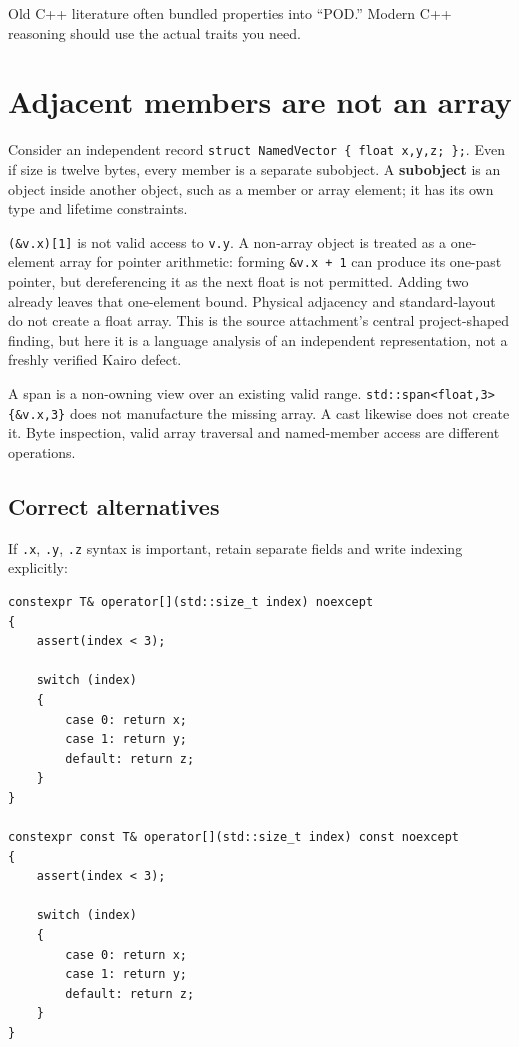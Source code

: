 Old C++ literature often bundled properties into ``POD.'' Modern C++ reasoning should use the actual traits you need.

\section{Adjacent members are not an array}\label{05-engine-i-ch003-adjacent-members-are-not-an-array}

Consider an independent record \texttt{struct\ NamedVector\ \{\ float\ x,y,z;\ \};}. Even if size is twelve bytes, every member is a separate subobject. A \textbf{subobject} is an object inside another object, such as a member or array element; it has its own type and lifetime constraints.

\texttt{(\&v.x){[}1{]}} is not valid access to \texttt{v.y}. A non-array object is treated as a one-element array for pointer arithmetic: forming \texttt{\&v.x\ +\ 1} can produce its one-past pointer, but dereferencing it as the next float is not permitted. Adding two already leaves that one-element bound. Physical adjacency and standard-layout do not create a float array. This is the source attachment's central project-shaped finding, but here it is a language analysis of an independent representation, not a freshly verified Kairo defect.

A span is a non-owning view over an existing valid range. \texttt{std::span\textless{}float,3\textgreater{}\{\&v.x,3\}} does not manufacture the missing array. A cast likewise does not create it. Byte inspection, valid array traversal and named-member access are different operations.

\subsection{Correct alternatives}\label{05-engine-i-ch003-correct-alternatives}

If \texttt{.x}, \texttt{.y}, \texttt{.z} syntax is important, retain separate fields and write indexing explicitly:

\begin{verbatim}
constexpr T& operator[](std::size_t index) noexcept
{
    assert(index < 3);

    switch (index)
    {
        case 0: return x;
        case 1: return y;
        default: return z;
    }
}

constexpr const T& operator[](std::size_t index) const noexcept
{
    assert(index < 3);

    switch (index)
    {
        case 0: return x;
        case 1: return y;
        default: return z;
    }
}
\end{verbatim}

